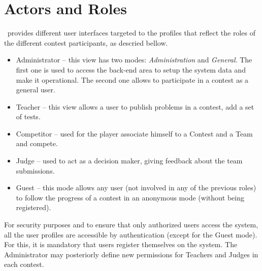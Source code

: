 
\section{Actors and Roles}\label{ss:profiles}

\quim\ provides different user interfaces targeted to the  profiles
that reflect the roles of the different contest participants, as descried bellow.

\begin{itemize}
\item \textsf{Administrator} -- this view has two modes:  \emph{Administration} and  \emph{General}.
The first one is used to access the back-end area to setup the system data and make it operational.
The second one allows to participate in a contest as a general user.

\item \textsf{Teacher} -- this view allows a user to publish problems in a contest, add a set of tests.

\item \textsf{Competitor} -- used for the player associate himself to a \textsf{Contest} and a \textsf{Team} and compete.


\item \textsf{Judge} -- used to act as a decision maker, giving feedback about the team submissions. 

\item \textsf{Guest} -- this mode allows any user (not involved in any of the previous roles)
to follow the progress of a contest in an anonymous mode (without being registered).

\end {itemize}

For security purposes and to ensure that only authorized users access the system,
all the user profiles are accessible by authentication (except for the \textsf{Guest} mode).
For this, it is mandatory that users register themselves on the system.
The Administrator may posteriorly define new permissions for \textsf{Teachers} and \textsf{Judges} in each contest.
